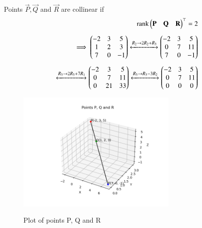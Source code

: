 \documentclass[journal]{IEEEtran}
\begin{document}
Points $\vec{P},\vec{Q}$ and $\vec{R}$ are collinear if 
\begin{align}
	\text{rank}\begin{pmatrix}\mathbf{P} & \mathbf{Q} & \mathbf{R}\end{pmatrix}^\top = 2\\[5pt]
	\implies \begin{pmatrix}-2 & 3 & 5\\1 & 2 & 3\\7 & 0 & -1\end{pmatrix}\xleftrightarrow[]{R_2 \rightarrow 2R_2 + R_3} \begin{pmatrix}-2 & 3 & 5\\0 & 7 & 11\\7 & 0 & -1\end{pmatrix}\\[5pt]
	\xleftrightarrow[]{R_3 \rightarrow 2R_3 + 7R_1} \begin{pmatrix}-2 & 3 & 5\\0 &7 & 11\\0 & 21 & 33\end{pmatrix} \xleftrightarrow[]{R_3 \rightarrow R_3 - 3R_2} \begin{pmatrix}-2 & 3 & 5\\0 & 7 & 11\\0 & 0 & 0\end{pmatrix}
\end{align}
\newpage
	\begin{figure}[h!]    
	  \begin{center}
		\includegraphics[width=0.7\textwidth]{fig/fig.png}
		\label{Graph}
		  \caption{Plot of points P, Q and R}  
	 \end{center}	  
	\end{figure}
\end{document}
